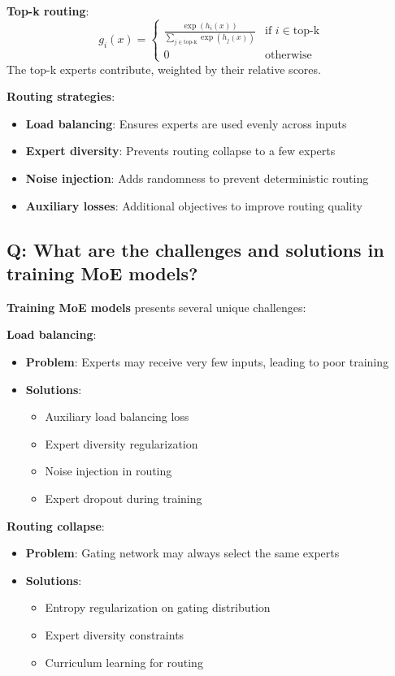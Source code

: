 \textbf{Top-k routing}:
\[
	g_i(x) = \begin{cases}
		\frac{\exp(h_i(x))}{\sum_{j \in \text{top-k}} \exp(h_j(x))} & \text{if } i \in \text{top-k} \\
		0                                                           & \text{otherwise}
	\end{cases}
\]
The top-k experts contribute, weighted by their relative scores.

\textbf{Routing strategies}:
\begin{itemize}
	\item \textbf{Load balancing}: Ensures experts are used evenly across inputs
	\item \textbf{Expert diversity}: Prevents routing collapse to a few experts
	\item \textbf{Noise injection}: Adds randomness to prevent deterministic routing
	\item \textbf{Auxiliary losses}: Additional objectives to improve routing quality
\end{itemize}

\subsection*{Q: What are the challenges and solutions in training MoE models?}
\textbf{Training MoE models} presents several unique challenges:

\textbf{Load balancing}:
\begin{itemize}
	\item \textbf{Problem}: Experts may receive very few inputs, leading to poor training
	\item \textbf{Solutions}:
	      \begin{itemize}
		      \item Auxiliary load balancing loss
		      \item Expert diversity regularization
		      \item Noise injection in routing
		      \item Expert dropout during training
	      \end{itemize}
\end{itemize}

\textbf{Routing collapse}:
\begin{itemize}
	\item \textbf{Problem}: Gating network may always select the same experts
	\item \textbf{Solutions}:
	      \begin{itemize}
		      \item Entropy regularization on gating distribution
		      \item Expert diversity constraints
		      \item Curriculum learning for routing
	      \end{itemize}
\end{itemize}

